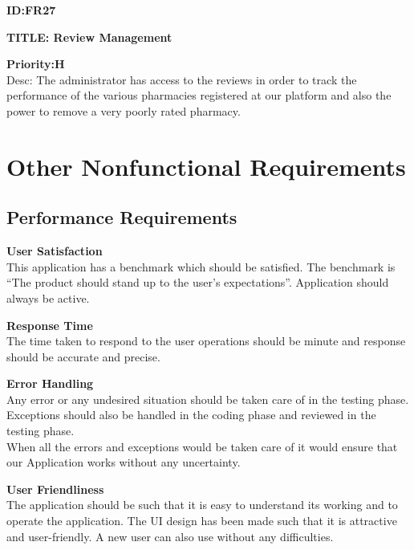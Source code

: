 \documentclass{scrreprt}
\begin{document}
\item \textbf{ID:FR27}
\item \textbf{TITLE: Review Management}
\item \textbf{Priority:H}\\
Desc: The administrator has access to the reviews in order to track the performance of the various pharmacies registered at our platform and also the power to remove a very poorly rated pharmacy.\\

\chapter{Other Nonfunctional Requirements}

\section{Performance Requirements}

\item \textbf{User Satisfaction}\\
This application has a benchmark which should be satisfied. The benchmark is “The product should stand up to the user’s expectations”. Application should always be active.\\

\item \textbf{Response Time}\\
The time taken to respond to the user operations should be minute and response should be accurate and precise.\\

\item \textbf{Error Handling}\\
Any error or any undesired situation should be taken care of in the testing phase.\\
Exceptions should also be handled in the coding phase and reviewed in the testing phase.\\
When all the errors and exceptions would be taken care of it would ensure that our Application works without any uncertainty.\\

\item \textbf{User Friendliness}\\ 
The application should be such that it is easy to understand its working and to operate the application. The UI design has been made such that it is attractive and user-friendly. A new user can also use without any difficulties.\\
\end{document}
